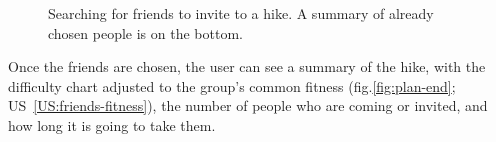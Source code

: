 \begin{figure}[h!]
    \centering
    \hfill
    \hfill
    \caption{Searching for friends to invite to a hike. A summary of already chosen people is on the bottom.}
    \label{fig:plan-invite-friends}
\end{figure}

Once the friends are chosen, the user can see a summary of the hike, with the difficulty chart adjusted to the group's common fitness (fig.\ref{fig:plan-end}; US~\ref{US:friends-fitness}), the number of people who are coming or invited, and how long it is going to take them.

